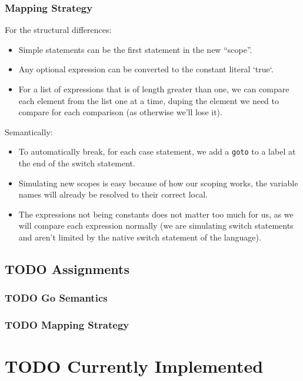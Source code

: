\documentclass[11pt]{article}
\begin{document}
\subsubsection{Mapping Strategy}
\label{sec:orgc6623a6}
For the structural differences:
\begin{itemize}
\item Simple statements can be the first statement in the new ``scope''.
\item Any optional expression can be converted to the constant literal `true`.
\item For a list of expressions that is of length greater than one, we
can compare each element from the list one at a time, duping the
element we need to compare for each comparison (as otherwise
we'll lose it).
\end{itemize}
Semantically:
\begin{itemize}
\item To automatically break, for each case statement, we add a \texttt{goto}
to a label at the end of the switch statement.
\item Simulating new scopes is easy because of how our scoping works,
the variable names will already be resolved to their correct local.
\item The expressions not being constants does not matter too much for
us, as we will compare each expression normally (we are
simulating switch statements and aren't limited by the native
switch statement of the language).
\end{itemize}
\subsection{{\bfseries\sffamily TODO} Assignments}
\label{sec:org9e6377a}
\subsubsection{{\bfseries\sffamily TODO} Go Semantics}
\label{sec:org866d7d7}
\subsubsection{{\bfseries\sffamily TODO} Mapping Strategy}
\label{sec:orga91ab40}
\section{{\bfseries\sffamily TODO} Currently Implemented}
\label{sec:org2d00ec0}
\end{document}
